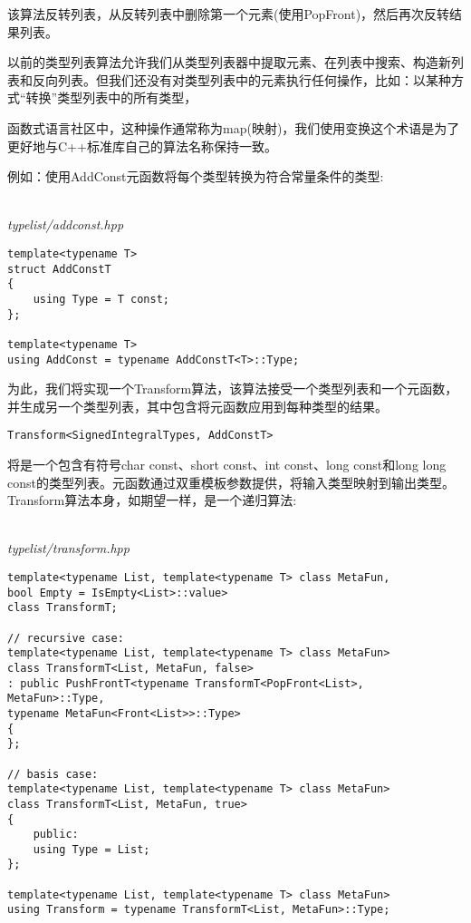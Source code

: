 该算法反转列表，从反转列表中删除第一个元素(使用PopFront)，然后再次反转结果列表。


以前的类型列表算法允许我们从类型列表器中提取元素、在列表中搜索、构造新列表和反向列表。但我们还没有对类型列表中的元素执行任何操作，比如：以某种方式“转换”类型列表中的所有类型，

\begin{tcolorbox}[colback=webgreen!5!white,colframe=webgreen!75!black]
\hspace*{0.75cm}函数式语言社区中，这种操作通常称为map(映射)，我们使用变换这个术语是为了更好地与C++标准库自己的算法名称保持一致。
\end{tcolorbox}

例如：使用AddConst元函数将每个类型转换为符合常量条件的类型:

\hspace*{\fill} \\ %
\noindent
\textit{typelist/addconst.hpp}
\begin{lstlisting}[style=styleCXX]
template<typename T>
struct AddConstT
{
	using Type = T const;
};

template<typename T>
using AddConst = typename AddConstT<T>::Type;
\end{lstlisting}

为此，我们将实现一个Transform算法，该算法接受一个类型列表和一个元函数，并生成另一个类型列表，其中包含将元函数应用到每种类型的结果。

\begin{lstlisting}[style=styleCXX]
Transform<SignedIntegralTypes, AddConstT>
\end{lstlisting}

将是一个包含有符号char const、short const、int const、long const和long long const的类型列表。元函数通过双重模板参数提供，将输入类型映射到输出类型。Transform算法本身，如期望一样，是一个递归算法:

\hspace*{\fill} \\ %
\noindent
\textit{typelist/transform.hpp}
\begin{lstlisting}[style=styleCXX]
template<typename List, template<typename T> class MetaFun,
bool Empty = IsEmpty<List>::value>
class TransformT;

// recursive case:
template<typename List, template<typename T> class MetaFun>
class TransformT<List, MetaFun, false>
: public PushFrontT<typename TransformT<PopFront<List>, MetaFun>::Type,
typename MetaFun<Front<List>>::Type>
{
};

// basis case:
template<typename List, template<typename T> class MetaFun>
class TransformT<List, MetaFun, true>
{
	public:
	using Type = List;
};

template<typename List, template<typename T> class MetaFun>
using Transform = typename TransformT<List, MetaFun>::Type;
\end{lstlisting}


